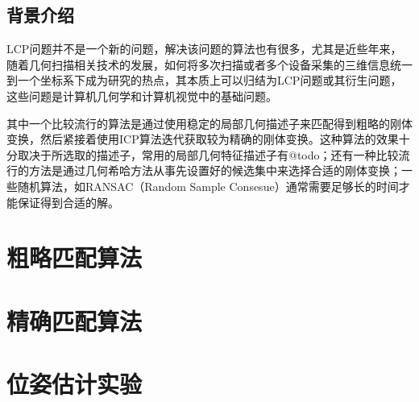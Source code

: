 \subsection{背景介绍}
LCP问题并不是一个新的问题，解决该问题的算法也有很多，尤其是近些年来，随着几何扫描相关技术的发展，如何将多次扫描或者多个设备采集的三维信息统一到一个坐标系下成为研究的热点，其本质上可以归结为LCP问题或其衍生问题，这些问题是计算机几何学和计算机视觉中的基础问题。

其中一个比较流行的算法是通过使用稳定的局部几何描述子来匹配得到粗略的刚体变换，然后紧接着使用ICP算法迭代获取较为精确的刚体变换\cite{li2005multiscale}。这种算法的效果十分取决于所选取的描述子，常用的局部几何特征描述子有@todo；还有一种比较流行的方法是通过几何希哈方法从事先设置好的候选集中来选择合适的刚体变换\cite{wolfson1997geometric}；一些随机算法，如RANSAC（Random Sample Consesue）\cite{bolles1981ransac}通常需要足够长的时间才能保证得到合适的解。
\section{粗略匹配算法}

\section{精确匹配算法}

\section{位姿估计实验}


